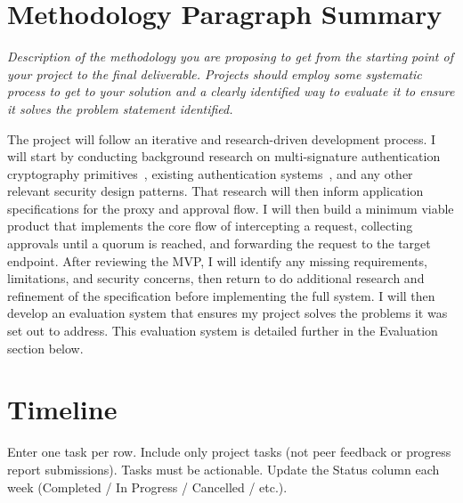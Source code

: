 \documentclass[12pt]{article}
\newcommand{\instruction}[1]{{\small\itshape #1}}
\begin{document}
\section*{Methodology Paragraph Summary}

\instruction{Description of the methodology you are proposing to get from the starting point of your project to the final deliverable. Projects should employ some systematic process to get to your solution and a clearly identified way to evaluate it to ensure it solves the problem statement identified.}

The project will follow an iterative and research-driven development process. I will start by conducting background research on multi-signature authentication cryptography primitives~\cite{shamir-secret-sharing,frost,musig2,gg18,gg20,dkls18,dkls19,mpc-expander-graph}, existing authentication systems~\cite{authelia}, and any other relevant security design patterns. That research will then inform application specifications for the proxy and approval flow. I will then build a minimum viable product that implements the core flow of intercepting a request, collecting approvals until a quorum is reached, and forwarding the request to the target endpoint. After reviewing the MVP, I will identify any missing requirements, limitations, and security concerns, then return to do additional research and refinement of the specification before implementing the full system. I will then develop an evaluation system that ensures my project solves the problems it was set out to address. This evaluation system is detailed further in the Evaluation section below.

\section*{Timeline}

{\small Enter one task per row. Include only project tasks (not peer feedback
or progress report submissions). Tasks must be actionable. Update the Status
column each week (Completed / In Progress / Cancelled / etc.).}
\end{document}
